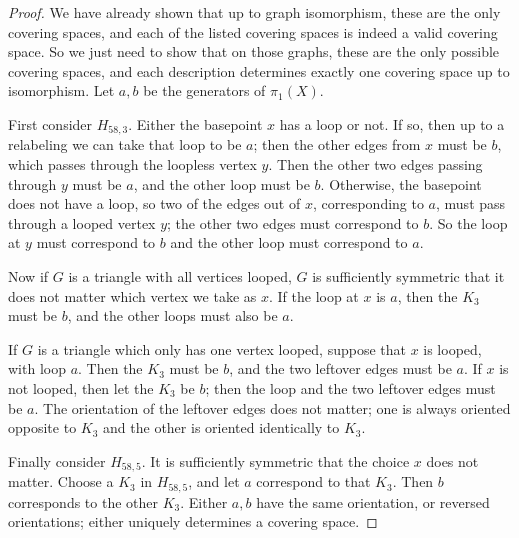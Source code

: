 \documentclass[10pt]{article}
\theoremstyle{definition}
\begin{document}
\begin{proof}
We have already shown that up to graph isomorphism, these are the only covering spaces, and each of the listed covering spaces is indeed a valid covering space.
So we just need to show that on those graphs, these are the only possible covering spaces, and each description determines exactly one covering space up to isomorphism.
Let $a,b$ be the generators of $\pi_1(X)$.

First consider $H_{58,3}$. Either the basepoint $x$ has a loop or not.
If so, then up to a relabeling we can take that loop to be $a$; then the other edges from $x$ must be $b$, which passes through the loopless vertex $y$. Then the other two edges passing through $y$ must be $a$, and the other loop must be $b$.
Otherwise, the basepoint does not have a loop, so two of the edges out of $x$, corresponding to $a$, must pass through a looped vertex $y$; the other two edges must correspond to $b$. So the loop at $y$ must correspond to $b$ and the other loop must correspond to $a$.

Now if $G$ is a triangle with all vertices looped, $G$ is sufficiently symmetric that it does not matter which vertex we take as $x$.
If the loop at $x$ is $a$, then the $K_3$ must be $b$, and the other loops must also be $a$.

If $G$ is a triangle which only has one vertex looped, suppose that $x$ is looped, with loop $a$.
Then the $K_3$ must be $b$, and the two leftover edges must be $a$.
If $x$ is not looped, then let the $K_3$ be $b$; then the loop and the two leftover edges must be $a$.
The orientation of the leftover edges does not matter; one is always oriented opposite to $K_3$ and the other is oriented identically to $K_3$.

Finally consider $H_{58,5}$. It is sufficiently symmetric that the choice $x$ does not matter.
Choose a $K_3$ in $H_{58,5}$, and let $a$ correspond to that $K_3$.
Then $b$ corresponds to the other $K_3$.
Either $a,b$ have the same orientation, or reversed orientations; either uniquely determines a covering space.
\end{proof}
\end{document}
